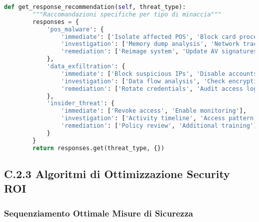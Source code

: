 \begin{lstlisting}[language=Python, caption=ML Pipeline per Threat Detection GDO]
    def get_response_recommendation(self, threat_type):
        """Raccomandazioni specifiche per tipo di minaccia"""
        responses = {
            'pos_malware': {
                'immediate': ['Isolate affected POS', 'Block card processing'],
                'investigation': ['Memory dump analysis', 'Network trace'],
                'remediation': ['Reimage system', 'Update AV signatures']
            },
            'data_exfiltration': {
                'immediate': ['Block suspicious IPs', 'Disable accounts'],
                'investigation': ['Data flow analysis', 'Check encryption'],
                'remediation': ['Rotate credentials', 'Audit access logs']
            },
            'insider_threat': {
                'immediate': ['Revoke access', 'Enable monitoring'],
                'investigation': ['Activity timeline', 'Access pattern analysis'],
                'remediation': ['Policy review', 'Additional training']
            }
        }
        return responses.get(threat_type, {})
\end{lstlisting}

\subsection{\texorpdfstring{\textbf{C.2.3 Algoritmi di Ottimizzazione Security ROI}}{C.2.3 - Algoritmi di Ottimizzazione Security ROI}}

\subsubsection{Sequenziamento Ottimale Misure di Sicurezza}

